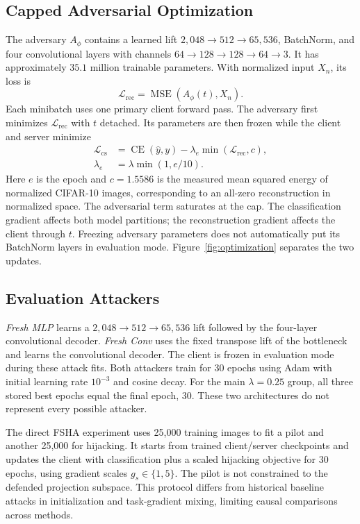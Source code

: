 \subsection{Capped Adversarial Optimization}
The adversary $A_\phi$ contains a learned lift $2{,}048\!\rightarrow\!512\!\rightarrow\!65{,}536$, BatchNorm, and four convolutional layers with channels $64\!\rightarrow\!128\!\rightarrow\!128\!\rightarrow\!64\!\rightarrow\!3$. It has approximately $35.1$ million trainable parameters. With normalized input $X_n$, its loss is
\begin{equation}
 \mathcal L_{\mathrm{rec}}=\operatorname{MSE}(A_\phi(t),X_n).
\end{equation}
Each minibatch uses one primary client forward pass. The adversary first minimizes $\mathcal L_{\mathrm{rec}}$ with $t$ detached. Its parameters are then frozen while the client and server minimize
\begin{align}
 \mathcal L_{\mathrm{cs}}&=\operatorname{CE}(\widehat y,y)-\lambda_e\min(\mathcal L_{\mathrm{rec}},c),\label{eq:objective}\\
 \lambda_e&=\lambda\min(1,e/10).
\end{align}
Here $e$ is the epoch and $c=1.5586$ is the measured mean squared energy of normalized CIFAR-10 images, corresponding to an all-zero reconstruction in normalized space. The adversarial term saturates at the cap. The classification gradient affects both model partitions; the reconstruction gradient affects the client through $t$. Freezing adversary parameters does not automatically put its BatchNorm layers in evaluation mode. Figure~\ref{fig:optimization} separates the two updates.



\subsection{Evaluation Attackers}
\textit{Fresh MLP} learns a $2{,}048\!\rightarrow\!512\!\rightarrow\!65{,}536$ lift followed by the four-layer convolutional decoder. \textit{Fresh Conv} uses the fixed transpose lift of the bottleneck and learns the convolutional decoder. The client is frozen in evaluation mode during these attack fits. Both attackers train for 30 epochs using Adam with initial learning rate $10^{-3}$ and cosine decay. For the main $\lambda=0.25$ group, all three stored best epochs equal the final epoch, 30. These two architectures do not represent every possible attacker.

The direct FSHA experiment uses 25,000 training images to fit a pilot and another 25,000 for hijacking. It starts from trained client/server checkpoints and updates the client with classification plus a scaled hijacking objective for 30 epochs, using gradient scales $g_s\in\{1,5\}$. The pilot is not constrained to the defended projection subspace. This protocol differs from historical baseline attacks in initialization and task-gradient mixing, limiting causal comparisons across methods.
